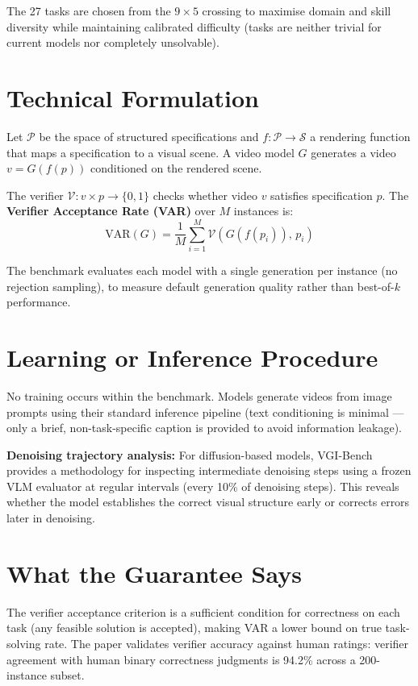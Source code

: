 \documentclass[10pt,twocolumn]{article}
\begin{document}
The 27 tasks are chosen from the $9 \times 5$ crossing to maximise
domain and skill diversity while maintaining calibrated difficulty
(tasks are neither trivial for current models nor completely unsolvable).

\section{Technical Formulation}

Let $\mathcal{P}$ be the space of structured specifications and
$f: \mathcal{P} \rightarrow \mathcal{S}$ a rendering function that
maps a specification to a visual scene. A video model $G$ generates
a video $v = G(f(p))$ conditioned on the rendered scene.

The verifier $\mathcal{V}: v \times p \rightarrow \{0, 1\}$ checks
whether video $v$ satisfies specification $p$. The
\textbf{Verifier Acceptance Rate (VAR)} over $M$ instances is:
\[
  \text{VAR}(G) = \frac{1}{M}\sum_{i=1}^M \mathcal{V}(G(f(p_i)),\, p_i)
\]

The benchmark evaluates each model with a single generation per
instance (no rejection sampling), to measure default generation
quality rather than best-of-$k$ performance.

\section{Learning or Inference Procedure}

No training occurs within the benchmark. Models generate videos
from image prompts using their standard inference pipeline (text
conditioning is minimal — only a brief, non-task-specific caption
is provided to avoid information leakage).

\textbf{Denoising trajectory analysis:} For diffusion-based models,
VGI-Bench provides a methodology for inspecting intermediate denoising
steps using a frozen VLM evaluator at regular intervals (every 10\%
of denoising steps). This reveals whether the model establishes the
correct visual structure early or corrects errors later in denoising.

\section{What the Guarantee Says}

The verifier acceptance criterion is a sufficient condition for
correctness on each task (any feasible solution is accepted), making
VAR a lower bound on true task-solving rate. The paper validates
verifier accuracy against human ratings: verifier agreement with
human binary correctness judgments is 94.2\% across a 200-instance
subset.
\end{document}
